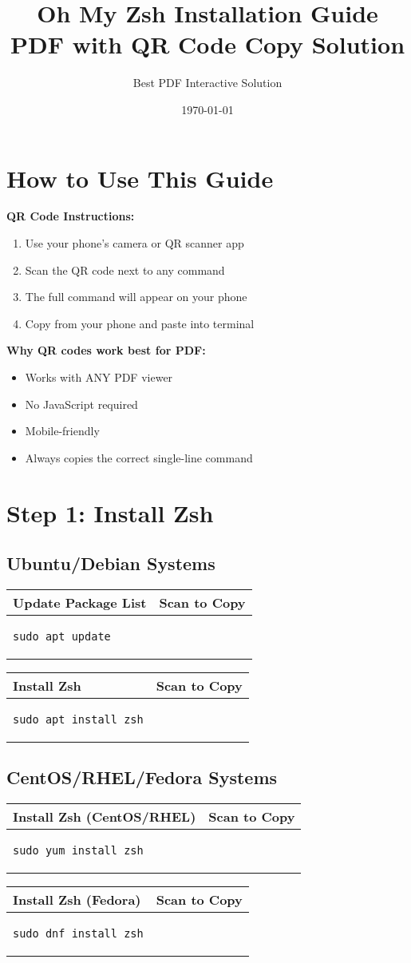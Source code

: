 \documentclass{article}
\title{Oh My Zsh Installation Guide\\
\large PDF with QR Code Copy Solution}
\author{Best PDF Interactive Solution}
\date{\today}
\newcommand{\codeqr}[2]{%
    \begin{table}[h]
    \begin{tabularx}{\textwidth}{|X|c|}
    \hline
    \textbf{#1} & \textbf{Scan to Copy} \\
    \hline
    \begin{lstlisting}
#2
    \end{lstlisting}
    & 
    \qrcode[height=2.5cm]{#2} \\
    \hline
    \end{tabularx}
    \end{table}
}
\begin{document}
\maketitle

\section{How to Use This Guide}

\begin{infobox}
\textbf{QR Code Instructions:}
\begin{enumerate}
    \item Use your phone's camera or QR scanner app
    \item Scan the QR code next to any command
    \item The full command will appear on your phone
    \item Copy from your phone and paste into terminal
\end{enumerate}

\textbf{Why QR codes work best for PDF:}
\begin{itemize}
    \item Works with ANY PDF viewer
    \item No JavaScript required
    \item Mobile-friendly
    \item Always copies the correct single-line command
\end{itemize}
\end{infobox}

\section{Step 1: Install Zsh}

\subsection{Ubuntu/Debian Systems}

\codeqr{Update Package List}{sudo apt update}

\codeqr{Install Zsh}{sudo apt install zsh}

\subsection{CentOS/RHEL/Fedora Systems}

\codeqr{Install Zsh (CentOS/RHEL)}{sudo yum install zsh}

\codeqr{Install Zsh (Fedora)}{sudo dnf install zsh}
\end{document}
